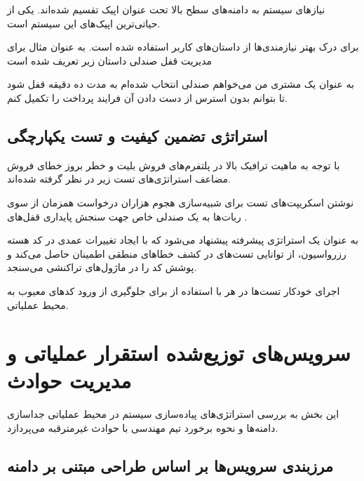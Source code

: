 \documentclass{article}
\begin{document}
نیازهای سیستم به دامنه‌های سطح بالا تحت عنوان اپیک  تقسیم شده‌اند. یکی از حیاتی‌ترین اپیک‌های این سیستم  است. 

برای درک بهتر نیازمندی‌ها از داستان‌های کاربر  استفاده شده است. به عنوان مثال برای مدیریت قفل صندلی داستان زیر تعریف شده است

به عنوان یک مشتری من می‌خواهم صندلی انتخاب شده‌ام به مدت ده دقیقه قفل شود تا بتوانم بدون استرس از دست دادن آن فرایند پرداخت را تکمیل کنم.

\subsection{استراتژی تضمین کیفیت و تست یکپارچگی}

با توجه به ماهیت ترافیک بالا در پلتفرم‌های فروش بلیت و خطر بروز خطای فروش مضاعف  استراتژی‌های تست زیر در نظر گرفته شده‌اند.

\begin{description}[font=$\bullet$~\normalsize\scshape]
\item {} نوشتن اسکریپت‌های تست برای شبیه‌سازی هجوم هزاران درخواست همزمان از سوی ربات‌ها  به یک صندلی خاص جهت سنجش پایداری قفل‌های .
\item {} به عنوان یک استراتژی پیشرفته پیشنهاد می‌شود که با ایجاد تغییرات عمدی در کد هسته رزرواسیون، از توانایی تست‌های  در کشف خطاهای منطقی اطمینان حاصل می‌کند و پوشش کد  را در ماژول‌های تراکنشی می‌سنجد.
\item {} اجرای خودکار تست‌ها در هر  با استفاده از  برای جلوگیری از ورود کدهای معیوب به محیط عملیاتی.
\end{description}

\section{سرویس‌های توزیع‌شده استقرار عملیاتی و مدیریت حوادث}

این بخش به بررسی استراتژی‌های پیاده‌سازی سیستم در محیط عملیاتی جداسازی دامنه‌ها و نحوه برخورد تیم مهندسی با حوادث غیرمترقبه می‌پردازد.

\subsection{مرزبندی سرویس‌ها بر اساس طراحی مبتنی بر دامنه}
\end{document}
